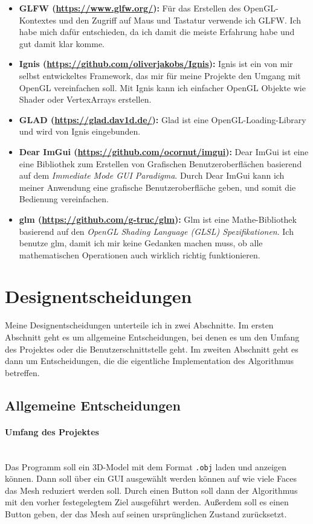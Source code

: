 \documentclass[a4paper,12pt]{book}
\newcommand{\myparagraph}[1]{\paragraph*{#1}\mbox{}\\}
\begin{document}
\begin{itemize}
	\item \textbf{GLFW (\url{https://www.glfw.org/}):}
	Für das Erstellen des OpenGL-Kontextes und den Zugriff auf Maus und Tastatur verwende ich GLFW. 
	Ich habe mich dafür entschieden, da ich damit die meiste Erfahrung habe und gut damit klar komme.
	\item \textbf{Ignis (\url{https://github.com/oliverjakobs/Ignis}):}
	Ignis ist ein von mir selbst entwickeltes Framework, das mir für meine Projekte den Umgang mit OpenGL vereinfachen soll. 
	Mit Ignis kann ich einfacher OpenGL Objekte wie Shader oder VertexArrays erstellen.
	\item \textbf{GLAD (\url{https://glad.dav1d.de/}):} 
	Glad ist eine OpenGL-Loading-Library und wird von Ignis eingebunden.
	\item \textbf{Dear ImGui (\url{https://github.com/ocornut/imgui}):}
	Dear ImGui ist eine eine Bibliothek zum Erstellen von Grafischen Benutzeroberflächen basierend auf dem \emph{Immediate Mode GUI Paradigma}.
	Durch Dear ImGui kann ich meiner Anwendung eine grafische Benutzeroberfläche geben, und somit die Bedienung vereinfachen.
	\item \textbf{glm (\url{https://github.com/g-truc/glm}):}
	Glm ist eine Mathe-Bibliothek basierend auf den \emph{OpenGL Shading Language (GLSL) Spezifikationen}. 
	Ich benutze glm, damit ich mir keine Gedanken machen muss, ob alle mathematischen Operationen auch wirklich richtig funktionieren. 
\end{itemize}

\section*{Designentscheidungen}

Meine Designentscheidungen unterteile ich in zwei Abschnitte. Im ersten Abschnitt geht es um allgemeine Entscheidungen, bei denen es um den Umfang des Projektes oder die Benutzerschnittstelle geht. Im zweiten Abschnitt geht es dann um Entscheidungen, die die eigentliche Implementation des Algorithmus betreffen.

\subsection*{Allgemeine Entscheidungen}

\myparagraph{Umfang des Projektes}
Das Programm soll ein 3D-Model mit dem Format \texttt{.obj} laden und anzeigen können. Dann soll über ein GUI ausgewählt werden können auf wie viele Faces das Mesh reduziert werden soll. Durch einen Button soll dann der Algorithmus mit den vorher festegelegtem Ziel ausgeführt werden. Außerdem soll es einen Button geben, der das Mesh auf seinen ursprünglichen Zustand zurücksetzt.
\end{document}
